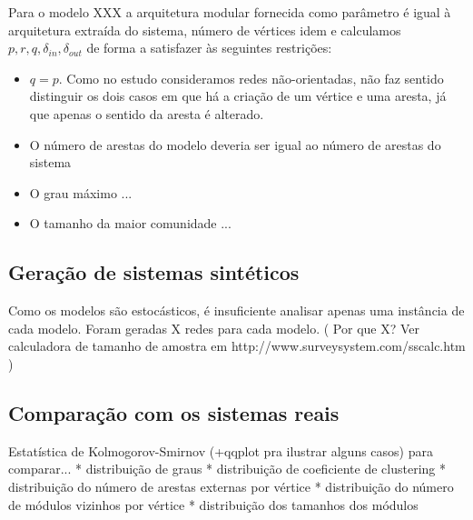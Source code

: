 \documentclass{acm_proc_article-sp}
\begin{document}
Para o modelo XXX a arquitetura modular fornecida como parâmetro é igual à arquitetura extraída do sistema, número de vértices idem e calculamos $p, r, q, \delta_{in}, \delta_{out}$ de forma a satisfazer às seguintes restrições:
\begin{itemize}
  \item $q = p$. Como no estudo consideramos redes não-orientadas, não faz sentido distinguir os dois casos em que há a criação de um vértice e uma aresta, já que apenas o sentido da aresta é alterado.
  \item O número de arestas do modelo deveria ser igual ao número de arestas do sistema
  \item O grau máximo ...
  \item O tamanho da maior comunidade ...
\end{itemize}

\subsection{Geração de sistemas sintéticos}

Como os modelos são estocásticos, é insuficiente analisar apenas uma instância de cada modelo. 
Foram geradas X redes para cada modelo. ( Por que X?
Ver calculadora de tamanho de amostra em http://www.surveysystem.com/sscalc.htm )

\subsection{Comparação com os sistemas reais}

Estatística de Kolmogorov-Smirnov (+qqplot pra ilustrar alguns casos) para comparar...
* distribuição de graus
* distribuição de coeficiente de clustering
* distribuição do número de arestas externas por vértice
* distribuição do número de módulos vizinhos por vértice
* distribuição dos tamanhos dos módulos


\end{document}
